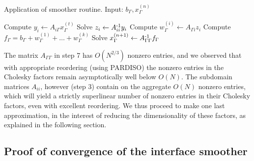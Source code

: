 \begin{algorithm}
\caption{Application of smoother routine. Input: $b_\Gamma,x_\Gamma^{(n)}$}
\label{alg:interface-smoother}
\begin{algorithmic}[1]
\STATE Compute $y_i\leftarrow A_{i \Gamma}x_\Gamma^{(t)}$
\STATE Solve $z_i\leftarrow A_{ii}^{\operatorname{-1}} y_i$
\STATE Compute $w_\Gamma^{(i)}\leftarrow A_{\Gamma i}z_i$
\ENDFOR
\STATE Compute $f_\Gamma=b_\Gamma+w_\Gamma^{(1)}+\ldots+w_\Gamma^{(k)}$
\STATE Solve $x_\Gamma^{(n+1)}\leftarrow A_{\Gamma\Gamma}^{\operatorname{-1}} f_\Gamma$
\end{algorithmic}
\end{algorithm}

The matrix $A_{\Gamma\Gamma}$ in step 7 has $O(N^{2/3})$ nonzero entries, and we observed that with appropriate reordering (using PARDISO) the nonzero entries in the
Cholesky factors remain asymptotically well below $O(N)$. The subdomain matrices $A_{ii}$, however (step 3) contain on the aggregate $O(N)$ nonzero
entries, which will yield a strictly superlinear number of nonzero entries in their Cholesky factors, even with excellent reordering. We thus proceed to make one
last approximation, in the interest of reducing the dimensionality of these factors, as explained in the following section.

\subsection{Proof of convergence of the interface smoother}

